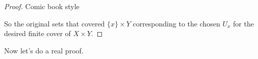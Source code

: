 \begin{proof}{Comic book style}
\begin{figure}[h!]
\begin{center}
		\end{center}
	\end{figure}
	
	So the original sets that covered $\{x\} \times Y$ corresponding to the chosen $U_x$ for the desired finite cover of $X \times Y$. 
\end{proof}
Now let's do a real proof. 
